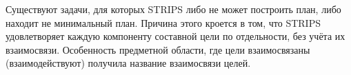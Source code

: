 \documentclass[b5paper,11pt]{book}
\numberwithin{Def}{section}
\numberwithin{Th}{chapter}
\numberwithin{St}{chapter}
\begin{document}
	Существуют задачи, для которых STRIPS либо не может построить план, либо находит не минимальный план. Причина этого кроется в том, что STRIPS удовлетворяет каждую компоненту составной цели по отдельности, без учёта их взаимосвязи. Особенность предметной области, где цели взаимосвязаны (взаимодействуют) получила название взаимосвязи целей.
	
	\printbibliography
\end{document}
